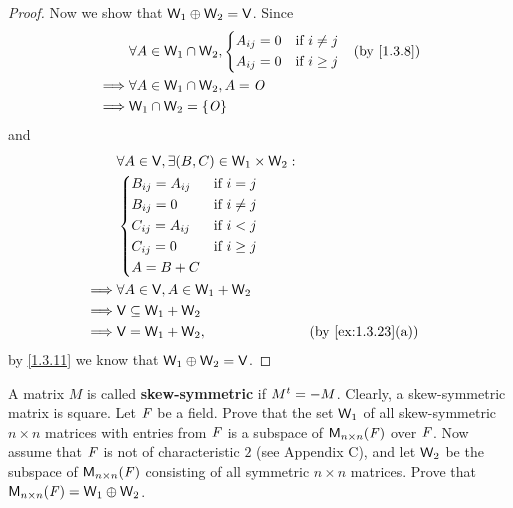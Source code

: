 \begin{proof}
  Now we show that \(\mathsf{W}_1 \oplus \mathsf{W}_2 = \mathsf{V}\).
  Since
  \begin{align*}
             & \forall A \in \W_1 \cap \W_2, \begin{dcases}
      A_{i j} = 0 & \text{if } i \neq j \\
      A_{i j} = 0 & \text{if } i \geq j
    \end{dcases} &  & \text{(by \cref{1.3.8})} \\
    \implies & \forall A \in \W_1 \cap \W_2, A = \zm                                                  \\
    \implies & \W_1 \cap \W_2 = \set{\zm}
  \end{align*}
  and
  \begin{align*}
             & \forall A \in \V, \exists (B, C) \in \W_1 \times \W_2 :                                      \\
             & \begin{dcases}
      B_{i j} = A_{i j} & \text{if } i = j    \\
      B_{i j} = 0       & \text{if } i \neq j \\
      C_{i j} = A_{i j} & \text{if } i < j    \\
      C_{i j} = 0       & \text{if } i \geq j \\
      A = B + C
    \end{dcases}                                                                   \\
    \implies & \forall A \in \V, A \in \W_1 + \W_2                                                          \\
    \implies & \V \subseteq \W_1 + \W_2                                                                     \\
    \implies & \V = \W_1 + \W_2,                                       &  & \text{(by \cref{ex:1.3.23}(a))}
  \end{align*}
  by \cref{1.3.11} we know that \(\mathsf{W}_1 \oplus \mathsf{W}_2 = \mathsf{V}\).
\end{proof}

\begin{ex}\label{ex:1.3.28}
  A matrix \(M\) is called \textbf{skew-symmetric} if \({M}^{t} = -M\).
  Clearly, a skew-symmetric matrix is square.
  Let \(\mathit{F}\) be a field.
  Prove that the set \(\mathsf{W}_1\) of all skew-symmetric \(n \times n\) matrices with entries from \(\mathit{F}\) is a subspace of \(\mathsf{M}_{{n} \times n}({\mathit{F}})\) over \(\mathit{F}\).
  Now assume that \(\mathit{F}\) is not of characteristic \(2\) (see Appendix C), and let \(\mathsf{W}_2\) be the subspace of \(\mathsf{M}_{{n} \times n}({\mathit{F}})\) consisting of all symmetric \(n \times n\) matrices.
  Prove that \(\mathsf{M}_{{n} \times n}({\mathit{F}}) = \mathsf{W}_1 \oplus \mathsf{W}_2\).
\end{ex}

